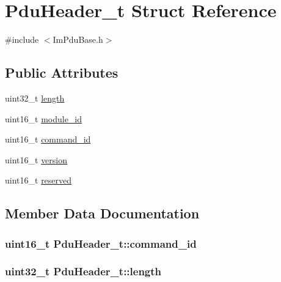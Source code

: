 \hypertarget{struct_pdu_header__t}{}\section{Pdu\+Header\+\_\+t Struct Reference}
\label{struct_pdu_header__t}


{\ttfamily \#include $<$Im\+Pdu\+Base.\+h$>$}

\subsection*{Public Attributes}
\begin{DoxyCompactItemize}
\item 
uint32\+\_\+t \hyperlink{struct_pdu_header__t_a9f9f689bf9e31e5a7fbe3332459a750e}{length}
\item 
uint16\+\_\+t \hyperlink{struct_pdu_header__t_a96ed27c9baa44e30a09c07701c3a21fb}{module\+\_\+id}
\item 
uint16\+\_\+t \hyperlink{struct_pdu_header__t_aabddd142fb9fd7aa970bddd1340eab01}{command\+\_\+id}
\item 
uint16\+\_\+t \hyperlink{struct_pdu_header__t_ab71a8e7c6ba0c24544c9cda6809c4497}{version}
\item 
uint16\+\_\+t \hyperlink{struct_pdu_header__t_a350b4452cd807d100cb5e3c22bf639fb}{reserved}
\end{DoxyCompactItemize}


\subsection{Member Data Documentation}
\hypertarget{struct_pdu_header__t_aabddd142fb9fd7aa970bddd1340eab01}{}
\subsubsection[{command\+\_\+id}]{\setlength{\rightskip}{0pt plus 5cm}uint16\+\_\+t Pdu\+Header\+\_\+t\+::command\+\_\+id}\label{struct_pdu_header__t_aabddd142fb9fd7aa970bddd1340eab01}
\hypertarget{struct_pdu_header__t_a9f9f689bf9e31e5a7fbe3332459a750e}{}
\subsubsection[{length}]{\setlength{\rightskip}{0pt plus 5cm}uint32\+\_\+t Pdu\+Header\+\_\+t\+::length}\label{struct_pdu_header__t_a9f9f689bf9e31e5a7fbe3332459a750e}
\hypertarget{struct_pdu_header__t_a96ed27c9baa44e30a09c07701c3a21fb}{}
